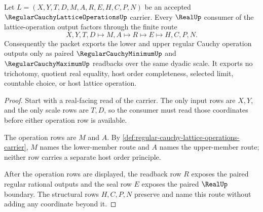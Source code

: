 \begin{theorem}
\label{thm:regular-cauchy-lattice-operations-minmax-readback}
Let $L=(X,Y,T,D,M,A,R,E,H,C,P,N)$ be an accepted $\RegularCauchyLatticeOperationsUp$ carrier. Every $\RealUp$ consumer of the lattice-operation output factors through the finite route
$$
X,Y,T,D \longmapsto M,A \longmapsto R \longmapsto E \longmapsto H,C,P,N .
$$
Consequently the packet exports the lower and upper regular Cauchy operation outputs only as paired $\RegularCauchyMinimumUp$ and $\RegularCauchyMaximumUp$ readbacks over the same dyadic scale. It exports no trichotomy, quotient real equality, host order completeness, selected limit, countable choice, or host lattice operation.
\end{theorem}
\begin{proof}
Start with a real-facing read of the carrier. The only input rows are $X,Y$, and the only scale rows are $T,D$, so the consumer must read those coordinates before either operation row is available.

The operation rows are $M$ and $A$. By \autoref{def:regular-cauchy-lattice-operations-carrier}, $M$ names the lower-member route and $A$ names the upper-member route; neither row carries a separate host order principle.

After the operation rows are displayed, the readback row $R$ exposes the paired regular rational outputs and the seal row $E$ exposes the paired $\RealUp$ boundary. The structural rows $H,C,P,N$ preserve and name this route without adding any coordinate beyond it.
\end{proof}


\begin{closurestatus}{\RegularCauchyLatticeOperationsUp}
  \theoryclosure{\seedClosure}
  \formalstatus{\unformalizedV}
\end{closurestatus}

